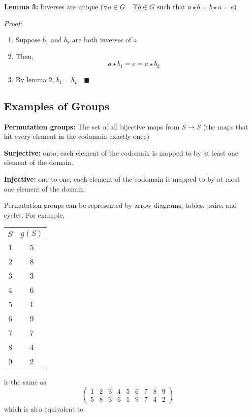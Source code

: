 \documentclass[12pt]{report}
\newcommand{\qed}{\quad \blacksquare}
\begin{document}
\textbf{Lemma 3:} Inverses are unique ($\forall a \in G \quad \exists ! b \in G \text{ such that } a \star b = b \star a = e$)

\emph{Proof:}
\begin{enumerate}
    \item Suppose $b_1$ and $b_2$ are both inverses of $a$
    \item Then, 
    \[a \star b_1 = e = a \star b_2\]
    \item By lemma 2, $b_1 = b_2 \qed$
\end{enumerate}

\subsection*{Examples of Groups}
\textbf{Permutation groups:} The set of all bijective maps from $S \to S$ (the maps that hit every element in the codomain exactly once)

\textbf{Surjective:} onto; each element of the codomain is mapped to by at least one element of the domain.

\textbf{Injective:} one-to-one; each element of the codomain is mapped to by at most one element of the domain
  
Permutation groups can be represented by arrow diagrams, tables, pairs, and cycles. For example, 
\begin{center}
    \begin{tabular*}{0.78 in}{|c|c|}
        \hline
        $S$ & $g(S)$\\
        \hline
        1 & 5\\
        2 & 8\\
        3 & 3\\
        4 & 6\\
        5 & 1\\
        6 & 9\\
        7 & 7\\
        8 & 4\\
        9 & 2\\
        \hline
    \end{tabular*}
\end{center}

is the same as 
\[\begin{pmatrix}
    1 & 2 & 3 & 4 & 5 & 6 & 7 & 8 & 9\\
    5 & 8 & 3 & 6 & 1 & 9 & 7 & 4 & 2
\end{pmatrix}\]
which is also equivalent to 
\end{document}
